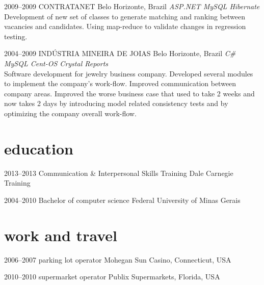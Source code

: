 \documentclass[]{friggeri-cv}
\begin{document}
\begin{entrylist}
\entry
{2009--2009}
{CONTRATANET}
{Belo Horizonte, Brazil}
{\emph{\bullet ASP.NET \bullet MySQL \bullet Hibernate } \\Development of new set of classes to generate matching and ranking between vacancies and candidates. Using map-reduce to validate changes in regression testing. }


%
 \entry
 {2004--2009}
 {INDÚSTRIA MINEIRA DE JOIAS}
 {Belo Horizonte, Brazil}
 {\emph{\bullet C\# \bullet MySQL \bullet Cent-OS \bullet Crystal Reports } \\ Software development for jewelry business company. Developed several modules to implement the company's work-flow. Improved communication between company areas. Improved the worse business case that used to take 2 weeks and now takes 2 days by introducing model related consistency tests and by optimizing the company overall work-flow. }
%

\end{entrylist}



\section{education}

\begin{entrylist}


\entry
{2013--2013}
{Communication  {\normalfont \& Interpersonal Skills Training}}
{Dale Carnegie Training}

\entry
{2004--2010}
{Bachelor {\normalfont of computer science}}
{Federal University of Minas Gerais}



\end{entrylist}


\section{work and travel} 

\begin{entrylist}

\entry
{2006--2007}
{parking lot {\normalfont operator}}
{Mohegan Sun Casino, Connecticut, USA}

\entry
{2010--2010} 
{supermarket {\normalfont operator}}
{Publix Supermarkets, Florida, USA}

\end{entrylist}
\end{document}
